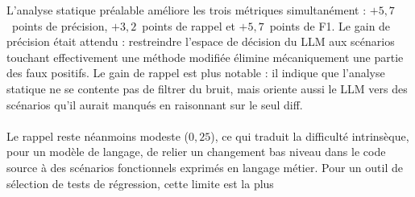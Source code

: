 \documentclass[12pt,a4paper]{article}
\begin{document}
                                                                               
  L'analyse statique préalable améliore les trois métriques simultanément :                                                                                                                                                
  $+5{,}7$~points de précision, $+3{,}2$~points de rappel et $+5{,}7$~points                                                                                                                                               
  de F1. Le gain de précision était attendu : restreindre l'espace de                                                                                                                                                      
  décision du LLM aux scénarios touchant effectivement une méthode modifiée                                                                                                                                                
  élimine mécaniquement une partie des faux positifs. Le gain de rappel est                                                                                                                                                
  plus notable : il indique que l'analyse statique ne se contente pas de                                                                                                                                                   
  filtrer du bruit, mais oriente aussi le LLM vers des scénarios qu'il                                                                                                                                                     
  aurait manqués en raisonnant sur le seul diff.\\\\ Le rappel reste néanmoins                                                                                                                                                 
  modeste ($0{,}25$), ce qui traduit la difficulté intrinsèque, pour un                                                                                                                                                    
  modèle de langage, de relier un changement bas niveau dans le code source                                                                                                                                                
  à des scénarios fonctionnels exprimés en langage métier. Pour un outil                                                                                                                                                   
  de sélection de tests de régression, cette limite est la plus                                                                                                                                                            
\end{document}
